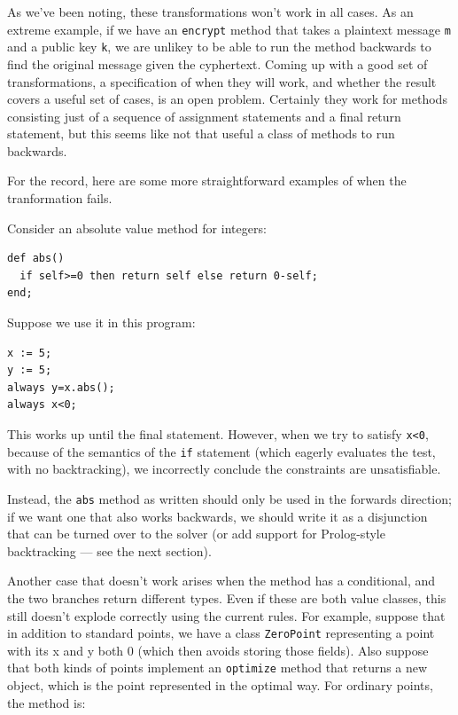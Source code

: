 \documentclass{article}
\begin{document}
As we've been noting, these transformations won't work in all cases.
As an extreme example, if we have an \verb|encrypt| method that takes
a plaintext message \verb|m| and a public key \verb|k|, we are unlikey
to be able to run the method backwards to find the original message
given the cyphertext.  Coming up with a good set of transformations, a
specification of when they will work, and whether the result covers a
useful set of cases, is an open problem.  Certainly they work for
methods consisting just of a sequence of assignment statements and a
final return statement, but this seems like not that useful a class of
methods to run backwards.

For the record, here are some more straightforward examples of when
the tranformation fails.  

Consider an absolute value method for integers:

\begin{verbatim}
def abs()
  if self>=0 then return self else return 0-self;
end;
\end{verbatim}

Suppose we use it in this program:

\begin{verbatim}
x := 5;
y := 5;
always y=x.abs();
always x<0;
\end{verbatim}

This works up until the final statement.  However, when we try to
satisfy \verb|x<0|, because of the semantics of the \verb|if|
statement (which eagerly evaluates the test, with no backtracking), we
incorrectly conclude the constraints are unsatisfiable.

Instead, the \verb|abs| method as written should only be used in the
forwards direction; if we want one that also works backwards, we
should write it as a disjunction that can be turned over to the
solver (or add support for Prolog-style backtracking --- see the next
section). 

Another case that doesn't work arises when the method has a
conditional, and the two branches return different types.  Even if
these are both value classes, this still doesn't explode correctly
using the current rules.  For example, suppose that in addition to
standard points, we have a class \verb|ZeroPoint| representing a point
with its x and y both 0 (which then avoids storing those fields).
Also suppose that both kinds of points implement an \verb|optimize|
method that returns a new object, which is the point represented in
the optimal way.  For ordinary points, the method is:
\end{document}
